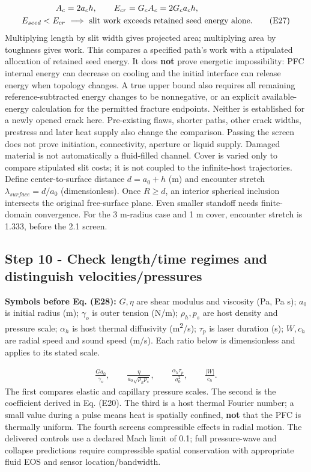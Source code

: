 \documentclass[10pt,a4paper]{article}
\begin{document}
{\small\begin{align*}
A_c&=2a_ch,\qquad E_{cr}=G_cA_c=2G_ca_ch,\\
E_{seed}<E_{cr}&\ \Longrightarrow\ \hbox{slit work exceeds retained seed energy alone}. \tag{E27}
\end{align*}}
Multiplying length by slit width gives projected area; multiplying area by toughness gives work. This compares a specified path's work with a stipulated allocation of retained seed energy. It does \textbf{not} prove energetic impossibility: PFC internal energy can decrease on cooling and the initial interface can release energy when topology changes. A true upper bound also requires all remaining reference-subtracted energy changes to be nonnegative, or an explicit available-energy calculation for the permitted fracture endpoints. Neither is established for a newly opened crack here. Pre-existing flaws, shorter paths, other crack widths, prestress and later heat supply also change the comparison. Passing the screen does not prove initiation, connectivity, aperture or liquid supply. Damaged material is not automatically a fluid-filled channel. Cover is varied only to compare stipulated slit costs; it is not coupled to the infinite-host trajectories. Define center-to-surface distance $d=a_0+h$ (m) and encounter stretch $\lambda_{surface}=d/a_0$ (dimensionless). Once $R\ge d$, an interior spherical inclusion intersects the original free-surface plane. Even smaller standoff needs finite-domain convergence. For the 3 \textmu{}m-radius case and 1 \textmu{}m cover, encounter stretch is 1.333, before the 2.1 screen.

\subsection*{Step 10  -  Check length/time regimes and distinguish velocities/pressures}
\textbf{Symbols before Eq. (E28):} $G,\eta$ are shear modulus and viscosity (Pa, Pa s); $a_0$ is initial radius (m); $\gamma_o$ is outer tension (N/m); $\rho_h,p_s$ are host density and pressure scale; $\alpha_h$ is host thermal diffusivity (m\textsuperscript{2}/s); $\tau_p$ is laser duration (s); $W,c_h$ are radial speed and sound speed (m/s). Each ratio below is dimensionless and applies to its stated scale.

{\small\begin{align*}
\frac{Ga_0}{\gamma_o},\qquad
\frac{\eta}{a_0\sqrt{\rho_h p_s}},\qquad
\frac{\alpha_h\tau_p}{a_0^2},\qquad
\frac{|W|}{c_h}. \tag{E28}
\end{align*}}
The first compares elastic and capillary pressure scales. The second is the coefficient derived in Eq. (E20). The third is a host thermal Fourier number; a small value during a pulse means heat is spatially confined, \textbf{not} that the PFC is thermally uniform. The fourth screens compressible effects in radial motion. The delivered controls use a declared Mach limit of 0.1; full pressure-wave and collapse predictions require compressible spatial conservation with appropriate fluid EOS and sensor location/bandwidth.
\end{document}
